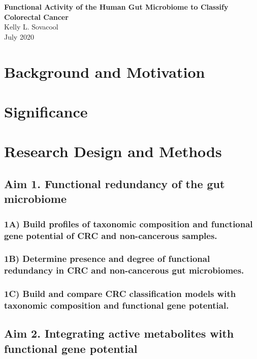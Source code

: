 \documentclass[11pt]{article}
\begin{document}
\sloppy
\begin{center}
\large{\textbf{
    Functional Activity of the Human Gut Microbiome to Classify Colorectal Cancer
}} \\
\vspace{11pt}
\small{
    Kelly L. Sovacool \\
    July 2020
}
\end{center}



\section*{Background and Motivation} %

\section*{Significance} %


\section*{Research Design and Methods}

\subsection*{Aim 1. Functional redundancy of the gut microbiome}

\subsubsection*{1A) Build profiles of taxonomic composition and functional gene potential of CRC and non-cancerous samples.}

\subsubsection*{1B) Determine presence and degree of functional redundancy in CRC and non-cancerous gut microbiomes.}

\subsubsection*{1C) Build and compare CRC classification models with taxonomic composition and functional gene potential.}


\subsection*{Aim 2. Integrating active metabolites with functional gene potential}
\end{document}
